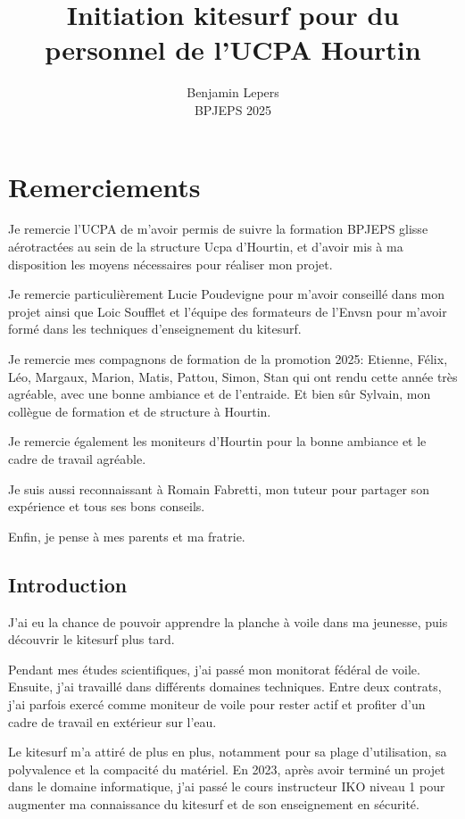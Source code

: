 \documentclass[11pt,a4paper]{report}
\begin{document}
\author{Benjamin Lepers \\ BPJEPS 2025 }
\title{Initiation kitesurf pour du personnel de l'UCPA Hourtin}
\maketitle
\chapter*{Remerciements}

Je remercie l'UCPA de m'avoir permis de suivre la formation
BPJEPS glisse aérotractées au sein de la structure Ucpa
d'Hourtin, et d'avoir mis à ma disposition les moyens nécessaires
pour réaliser mon projet.
 
Je remercie particulièrement Lucie Poudevigne pour m'avoir
conseillé  dans mon projet ainsi que Loic Soufflet et l'équipe des
formateurs de l'Envsn pour m'avoir formé dans les techniques
d'enseignement du kitesurf.

Je remercie mes compagnons de formation de la promotion 2025:
Etienne, Félix, Léo, Margaux, Marion, Matis, Pattou,
Simon, Stan qui ont rendu cette année très agréable,
avec une  bonne ambiance et de l'entraide.
Et bien s\^ur Sylvain, mon collègue de formation et 
de structure à Hourtin.

Je remercie également les moniteurs d'Hourtin  pour la
bonne ambiance et le cadre de travail agréable.

Je suis aussi reconnaissant à  Romain Fabretti, mon tuteur
pour partager son expérience et tous ses bons conseils.

Enfin, je pense à  mes parents et ma fratrie.

\tableofcontents
\newpage
\section{Introduction}

J'ai eu la chance de pouvoir apprendre la planche à voile 
dans ma jeunesse, puis découvrir le kitesurf plus tard.

Pendant mes études scientifiques, j'ai passé
mon monitorat fédéral de voile. Ensuite, j'ai travaillé dans différents
domaines techniques. Entre deux contrats, j'ai parfois exercé comme 
moniteur de voile pour rester actif et profiter d'un cadre de travail
en extérieur sur l'eau.

Le kitesurf m'a attiré de plus en plus, 
notamment pour sa plage d'utilisation, sa polyvalence et la 
compacité du matériel. En 2023, après avoir terminé un projet
dans le domaine informatique, j'ai passé le cours instructeur
IKO\cite{iko} niveau 1 pour augmenter ma connaissance du kitesurf
et de son enseignement en sécurité.
\end{document}
